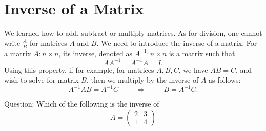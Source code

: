 \documentclass{ximera}
\begin{document}
\section*{Inverse of a Matrix}

We learned how to add, subtract or multiply matrices. As for division, one cannot write $\frac{A}{B}$ for matrices $A$ and $B$. We need to introduce the inverse of a matrix. For a matrix $A: n\times n$, its inverse, denoted as $A^{-1}: n\times n$ is a matrix such that
\begin{equation}\label{inverse}
AA^{-1}= A^{-1}A = I. 
\end{equation}
Using this property, if for example, for matrices $A, B, C$, we have $AB = C$, and wish to solve for matrix $B$, then we multiply by the inverse of $A$ as follows:
\begin{equation*}
A^{-1}AB= A^{-1}C \hspace{1cm} \Rightarrow \hspace{1cm} B = A^{-1}C.
\end{equation*}

Question: Which of the following is the inverse of
\begin{equation*}
A= \left(\begin{array}{cc}
  2 & 3   \\
  1 &  4
\end{array}\right)
\end{equation*}
\begin{multipleChoice}





\end{multipleChoice}
\end{document}
